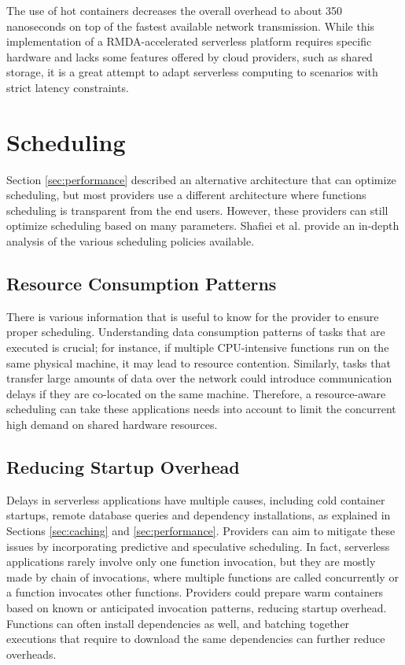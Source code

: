 \documentclass[
	a4paper, %
	12pt,
	twoside, %
]{LTJournalArticle}
\begin{document}
The use of hot containers decreases the overall overhead to about 350 nanoseconds on top of the fastest available network transmission. While this implementation of a RMDA-accelerated serverless platform requires specific hardware and lacks some features offered by cloud providers, such as shared storage, it is a great attempt to adapt serverless computing to scenarios with strict latency constraints.


\section{Scheduling}
Section \ref{sec:performance} described an alternative architecture that can optimize scheduling, but most providers use a different architecture where functions scheduling is transparent from the end users. However, these providers can still optimize scheduling based on many parameters. Shafiei et al. \cite{shafiei_serverless_2022} provide an in-depth analysis of the various scheduling policies available. 

\subsection{Resource Consumption Patterns}
There is various information that is useful to know for the provider to ensure proper scheduling. Understanding data consumption patterns of tasks that are executed is crucial; for instance, if multiple CPU-intensive functions run on the same physical machine, it may lead to resource contention. Similarly, tasks that transfer large amounts of data over the network could introduce communication delays if they are co-located on the same machine. Therefore, a resource-aware scheduling can take these applications needs into account to limit the concurrent high demand on shared hardware resources.

\subsection{Reducing Startup Overhead}
Delays in serverless applications have multiple causes, including cold container startups, remote database queries and dependency installations, as explained in Sections \ref{sec:caching} and \ref{sec:performance}. Providers can aim to mitigate these issues by incorporating predictive and speculative scheduling. In fact, serverless applications rarely involve only one function invocation, but they are mostly made by chain of invocations, where multiple functions are called concurrently or a function invocates other functions. Providers could prepare warm containers based on known or anticipated invocation patterns, reducing startup overhead. Functions can often install dependencies as well, and batching together executions that require to download the same dependencies can further reduce overheads.
\end{document}
